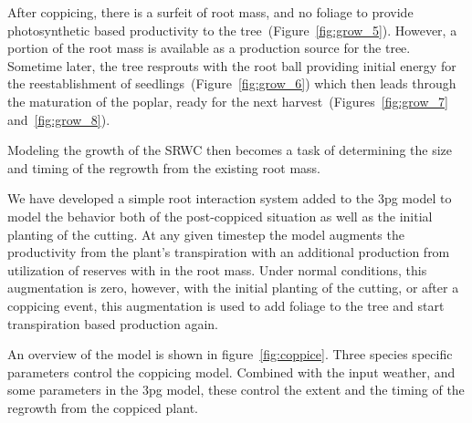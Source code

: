 \documentclass[10pt]{article}
\begin{document}
After coppicing, there is a surfeit of root mass, and no foliage to
provide photosynthetic based productivity to the
tree~(Figure~\ref{fig:grow_5}).  However, a portion of the root mass
is available as a production source for the tree.  Sometime later, the tree
resprouts with the root ball providing initial energy for the
reestablishment of seedlings~(Figure~\ref{fig:grow_6}) which then
leads through the maturation of the poplar, ready for the next
harvest~(Figures~\ref{fig:grow_7} and~\ref{fig:grow_8}).

Modeling the growth of the \ac{SRWC} then becomes a task of determining
the size and timing of the regrowth from the existing root mass.

We have developed a simple root interaction system added to the
\ac{3pg} model to model the behavior both of the post-coppiced
situation as well as the initial planting of the cutting. At any given
timestep the model augments the productivity from the plant's
transpiration with an additional production from utilization of
reserves with in the root mass.  Under normal conditions, this
augmentation is zero, however, with the initial planting of the
cutting, or after a coppicing event, this augmentation is used to add
foliage to the tree and start transpiration based production again.

An overview of the model is shown in figure~\ref{fig:coppice}.  Three
species specific parameters control the coppicing model.  Combined
with the input weather, and some parameters in the \ac{3pg} model,
these control the extent and the timing of the regrowth from the
coppiced plant.
\end{document}
